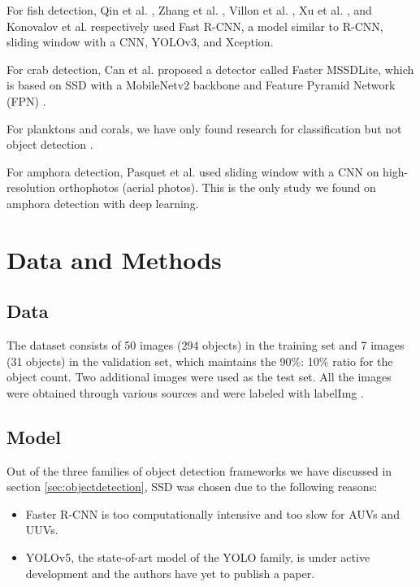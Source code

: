 \documentclass[a4paper, 11pt, oneside]{article}
\begin{document}
For fish detection, Qin et al. \cite{qin2015underwater, li2015fast}, Zhang et al. \cite{zhang2016unsupervised},
Villon et al. \cite{villon2016coral}, Xu et al. \cite{xu2018underwater}, and Konovalov et al.
\cite{konovalov2019underwater} respectively used Fast R-CNN, a model similar to R-CNN, sliding window with a CNN,
YOLOv3, and Xception.

For crab detection, Can et al. \cite{cao2020real} proposed a detector called Faster MSSDLite, which is based on SSD with
a MobileNetv2 backbone and Feature Pyramid Network (FPN) \cite{lin2017feature}.

For planktons and corals, we have only found research for classification but not object detection
\cite{qin2015underwater, moniruzzaman2017deep}.

For amphora detection, Pasquet et al. \cite{mccarthy20193d, pasquet2017amphora} used sliding window with a CNN on
high-resolution orthophotos (aerial photos). This is the only study we found on amphora detection with deep learning.

\section{Data and Methods}

\subsection{Data}

The dataset consists of 50 images (294 objects) in the training set and 7 images (31 objects) in the validation set,
which maintains the 90\%: 10\% ratio for the object count. Two additional images were used as the test set. All the
images were obtained through various sources
\cite{googleimages, scuba, itinari, whoi, phoenician, auscape, hakai, groplan, ionian, sanisera} and were labeled
with labelImg \cite{labelimg}.

\subsection{Model}

Out of the three families of object detection frameworks we have discussed in section \ref{sec:objectdetection}, SSD was
chosen due to the following reasons:

\begin{itemize}
  \item Faster R-CNN is too computationally intensive and too slow for AUVs and UUVs.
  \item YOLOv5, the state-of-art model of the YOLO family, is under active development and the authors have yet to
  publish a paper.
\end{itemize}
\end{document}
